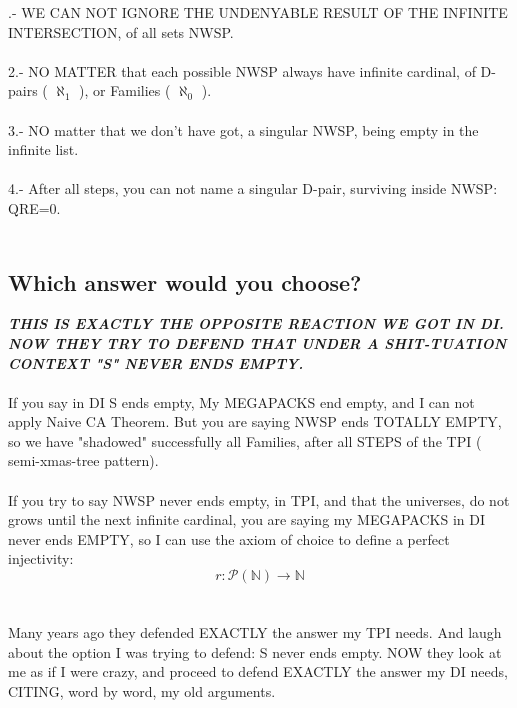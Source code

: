 			.- WE CAN NOT IGNORE THE UNDENYABLE RESULT OF THE INFINITE INTERSECTION, of all sets NWSP.\\\\
			2.- NO MATTER that each possible NWSP always have infinite cardinal, of D-pairs ( $\aleph_{1}$ ), or Families ( $\aleph_{0}$ ).\\\\
			3.- NO matter that we don't have got, a singular NWSP, being empty in the infinite list.\\\\
			4.- After all steps, you can not name a singular D-pair, surviving inside NWSP: QRE=0.
			\\\\
			
		
		\subsection{Which answer would you choose?}
		
			\noindent
			\textbf{\textit{THIS IS EXACTLY THE OPPOSITE REACTION WE GOT IN DI. NOW THEY TRY TO DEFEND THAT UNDER A SHIT-TUATION CONTEXT "S" NEVER ENDS EMPTY.}}
			\\\\
			
			\noindent
			If you say in DI S ends empty, My MEGAPACKS end empty, and I can not apply Naive CA Theorem. But you are saying NWSP ends TOTALLY EMPTY, so we have "shadowed" successfully all Families, after all STEPS of the TPI ( semi-xmas-tree pattern).
			\\\\
			
			\newpage
			\noindent
			If you try to say NWSP never ends empty, in TPI, and that the universes, do not grows until the next infinite cardinal, you are saying my MEGAPACKS in DI never ends EMPTY, so I can use the axiom of choice to define a perfect injectivity:\\
			$$ r: \mathcal{P}(\mathbb{N}) \rightarrow \mathbb{N} $$
			\\\\
			
			\noindent
			Many years ago they defended EXACTLY the answer my TPI needs. And laugh about the option I was trying to defend: S never ends empty. NOW they look at me as if I were crazy, and proceed to defend EXACTLY the answer my DI needs, CITING, word by word, my old arguments.
			\\\\
		
